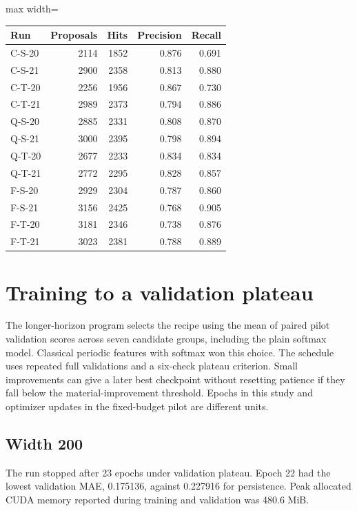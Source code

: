 \documentclass[11pt,oneside,openany]{book}
\begin{document}
\begin{center}\footnotesize\sffamily\setlength{\tabcolsep}{3.5pt}\renewcommand{\arraystretch}{1.2}
\begin{adjustbox}{max width=\linewidth}\begin{tabular}{@{}lrrrr@{}}\toprule
Run & Proposals & Hits & Precision & Recall \\ \midrule
C-S-20 & 2114 & 1852 & 0.876 & 0.691 \\
C-S-21 & 2900 & 2358 & 0.813 & 0.880 \\
C-T-20 & 2256 & 1956 & 0.867 & 0.730 \\
C-T-21 & 2989 & 2373 & 0.794 & 0.886 \\
Q-S-20 & 2885 & 2331 & 0.808 & 0.870 \\
Q-S-21 & 3000 & 2395 & 0.798 & 0.894 \\
Q-T-20 & 2677 & 2233 & 0.834 & 0.834 \\
Q-T-21 & 2772 & 2295 & 0.828 & 0.857 \\
F-S-20 & 2929 & 2304 & 0.787 & 0.860 \\
F-S-21 & 3156 & 2425 & 0.768 & 0.905 \\
F-T-20 & 3181 & 2346 & 0.738 & 0.876 \\
F-T-21 & 3023 & 2381 & 0.788 & 0.889 \\
\bottomrule\end{tabular}\end{adjustbox}\end{center}
\chapter{Training to a validation plateau}
The longer-horizon program selects the recipe using the mean of paired pilot validation scores across seven candidate groups, including the plain softmax model. Classical periodic features with softmax won this choice. The schedule uses repeated full validations and a six-check plateau criterion. Small improvements can give a later best checkpoint without resetting patience if they fall below the material-improvement threshold. Epochs in this study and optimizer updates in the fixed-budget pilot are different units.

\section*{Width 200}
The run stopped after 23 epochs under validation plateau. Epoch 22 had the lowest validation MAE, 0.175136, against 0.227916 for persistence. Peak allocated CUDA memory reported during training and validation was 480.6 MiB.
\end{document}
